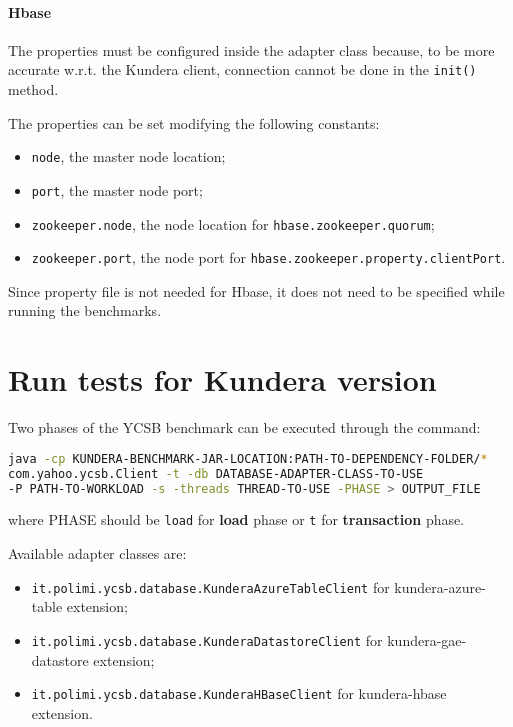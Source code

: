 \paragraph{Hbase}
The properties must be configured inside the adapter class because, to be more accurate w.r.t. the Kundera client, connection cannot be done in the \texttt{init()} method. 

\noindent The properties can be set modifying the following constants:
\begin{itemize}
\item \texttt{node}, the master node location;
\item \texttt{port}, the master node port;
\item \texttt{zookeeper.node}, the node location for \texttt{hbase.zookeeper.quorum};
\item \texttt{zookeeper.port}, the node port for \texttt{hbase.zookeeper.property.clientPort}.
\end{itemize}

\noindent Since property file is not needed for Hbase, it does not need to be specified while running the benchmarks.

\section{Run tests for Kundera version}
\label{appendix:ycsb-kundera}
Two phases of the YCSB benchmark can be executed through the command:

\begin{lstlisting}[language=bash, caption=Run Kundera clients benchmarks, numbers=none]
java -cp KUNDERA-BENCHMARK-JAR-LOCATION:PATH-TO-DEPENDENCY-FOLDER/*
com.yahoo.ycsb.Client -t -db DATABASE-ADAPTER-CLASS-TO-USE
-P PATH-TO-WORKLOAD -s -threads THREAD-TO-USE -PHASE > OUTPUT_FILE
\end{lstlisting}

\noindent where PHASE should be \texttt{load} for \textbf{load} phase or \texttt{t} for \textbf{transaction} phase.

\newparagraph Available adapter classes are:
\begin{itemize}
\item \texttt{it.polimi.ycsb.database.KunderaAzureTableClient} for kundera-azure-table extension;
\item \texttt{it.polimi.ycsb.database.KunderaDatastoreClient} for kundera-gae-datastore extension;
 \item\texttt{it.polimi.ycsb.database.KunderaHBaseClient} for kundera-hbase extension.
\end{itemize}

